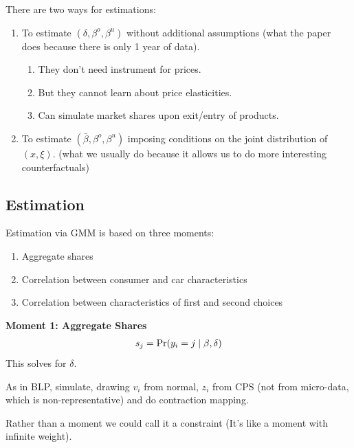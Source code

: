 \documentclass[11pt]{elegantbook}
\begin{document}
\begin{note}
    There are two ways for estimations:
    \begin{enumerate}
        \item To estimate $(\delta,\beta^o,\beta^u)$ without additional assumptions (what the paper does because there is only 1 year of data).
        \begin{enumerate}
            \item They don't need instrument for prices.
            \item But they cannot learn about price elasticities.
            \item Can simulate market shares upon exit/entry of products.
        \end{enumerate}
        \item To estimate $(\bar{\beta},\beta^o,\beta^u)$ imposing conditions on the joint distribution of $(x, \xi)$. (what we usually do because it allows us to do more interesting counterfactuals)
    \end{enumerate}
\end{note}

\subsection{Estimation}
Estimation via GMM is based on three moments:
\begin{enumerate}
    \item Aggregate shares
    \item Correlation between consumer and car characteristics
    \item Correlation between characteristics of first and second choices
\end{enumerate}

\textbf{Moment 1: Aggregate Shares}
\begin{equation}
    \begin{aligned}
        s_j=\textnormal{Pr}(y_i=j\mid\beta,\delta)
    \end{aligned}
    \nonumber
\end{equation}
This solves for $\delta$.

As in BLP, simulate, drawing $v_i$ from normal, $z_i$ from CPS (not from micro-data, which is non-representative) and do contraction mapping.
\begin{note}
    Rather than a moment we could call it a constraint (It's like a moment with infinite weight).
\end{note}
\end{document}
